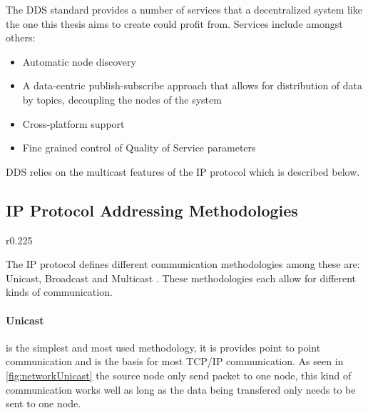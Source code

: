 The DDS standard provides a number of services that a decentralized system like the one this thesis aims to create could profit from.
Services include amongst others:

\begin{itemize}
	\item Automatic node discovery
	\item A data-centric publish-subscribe approach that allows for distribution of data by topics, decoupling the nodes of the system
	\item Cross-platform support
	\item Fine grained control of Quality of Service parameters
\end{itemize}

DDS relies on the multicast features of the IP protocol which is described below.

\subsection{IP Protocol Addressing Methodologies}

\begin{wrapfigure}{r}{0.225\textwidth}
	\vspace{-20pt}
	
	\vspace{-10pt}
\end{wrapfigure}

The IP protocol defines different communication methodologies among these are: Unicast, Broadcast \cite{RFC0919_Broadcast} and Multicast \cite{RFC1112_Multicast_IGMPv1}.
These methodologies each allow for different kinds of communication.

\paragraph{Unicast} is the simplest and most used methodology, it is provides point to point communication and is the basis for most TCP/IP communication.
As seen in \cref{fig:networkUnicast} the source node only send packet to one node, this kind of communication works well as long as the data being transfered only needs to be sent to one node.


